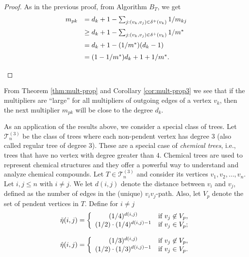 \documentclass[12pt]{article}
\newcommand{\mc}{\mathcal}
\begin{document}
\begin{proof}
 As in the previous proof, from Algorithm $B_T$, we get 
 \[
 \begin{array}{ll} \vspace{0.2cm}
    m_{pk}&=d_k+1-\sum_{j:(v_k,v_j)\in \delta^+(v_k)} 1/m_{kj} \\ \vspace{0.2cm}
       &\ge d_k+1-\sum_{j:(v_k,v_j)\in \delta^+(v_k)} 1/m^* \\ \vspace{0.2cm}
       &= d_k+1-(1/m^*)(d_k-1) \\ \vspace{0.2cm}
       &=(1-1/m^*)d_k+1+1/m^*.
 \end{array}   
 \]
 \end{proof}


From Theorem \ref{thm:mult-prop} and Corollary \ref{cor:mult-prop3} we see that if the multipliers are ``large'' for all multipliers of outgoing edges of a vertex $v_k$, then the next multiplier $m_{pk}$ will be close to the degree $d_k$. 


\medskip
As an application of the results above, we consider a special class of trees. Let $\mc{T}^{(3)}_n$ be the class of trees where each non-pendent vertex has degree $3$ (also called regular tree of degree $3$). These are a special case of {\em chemical trees}, i.e., trees that have no vertex with degree greater than $4$. Chemical trees are used to represent chemical structures and they offer a powerful way to understand and analyze chemical compounds.
Let $T \in\mc{T}^{(3)}_n$ and consider its vertices $v_1, v_2, \ldots, v_n$. Let $i,j \le n$ with $i \not = j$. We let $d(i,j)$ denote the distance between $v_i$ and $v_j$, defined as the number of edges in the (unique) $v_iv_j$-path. Also, let $V_p$ denote the set of pendent vertices in $T$. Define for $i \not = j$ 
%
\begin{equation}
 \label{eq:deg3-bd}  
\begin{array}{l}\vspace{0.4cm}
\tilde{\eta}(i,j)=
\left\{
\begin{array}{cr}
   (1/4)^{d(i,j)} &\mbox{if $v_j \not \in V_p$,} \\ 
   (1/2)\cdot (1/4)^{d(i,j)-1} &\mbox{if $v_j  \in V_p$;}
\end{array}
\right.
\\
\hat{\eta}(i,j)=
\left\{
\begin{array}{cr}
   (1/3)^{d(i,j)} &\mbox{if $v_j \not \in V_p$,} \\ 
   (1/2)\cdot (1/3)^{d(i,j)-1} &\mbox{if $v_j  \in V_p$.}
\end{array}
\right.
\end{array}
\end{equation}
\end{document}
